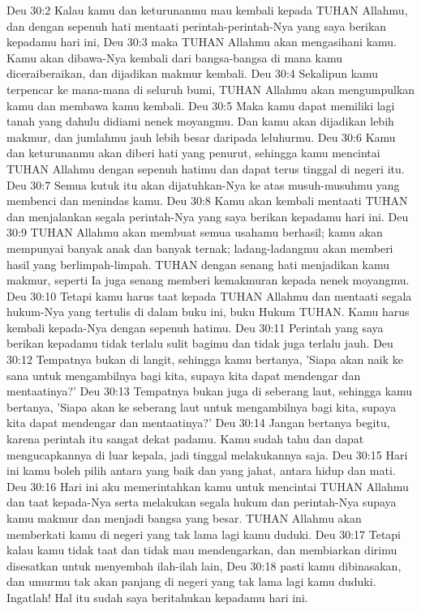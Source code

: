 Deu 30:2  Kalau kamu dan keturunanmu mau kembali kepada TUHAN Allahmu, dan dengan sepenuh hati mentaati perintah-perintah-Nya yang saya berikan kepadamu hari ini,
Deu 30:3  maka TUHAN Allahmu akan mengasihani kamu. Kamu akan dibawa-Nya kembali dari bangsa-bangsa di mana kamu diceraiberaikan, dan dijadikan makmur kembali.
Deu 30:4  Sekalipun kamu terpencar ke mana-mana di seluruh bumi, TUHAN Allahmu akan mengumpulkan kamu dan membawa kamu kembali.
Deu 30:5  Maka kamu dapat memiliki lagi tanah yang dahulu didiami nenek moyangmu. Dan kamu akan dijadikan lebih makmur, dan jumlahmu jauh lebih besar daripada leluhurmu.
Deu 30:6  Kamu dan keturunanmu akan diberi hati yang penurut, sehingga kamu mencintai TUHAN Allahmu dengan sepenuh hatimu dan dapat terus tinggal di negeri itu.
Deu 30:7  Semua kutuk itu akan dijatuhkan-Nya ke atas musuh-musuhmu yang membenci dan menindas kamu.
Deu 30:8  Kamu akan kembali mentaati TUHAN dan menjalankan segala perintah-Nya yang saya berikan kepadamu hari ini.
Deu 30:9  TUHAN Allahmu akan membuat semua usahamu berhasil; kamu akan mempunyai banyak anak dan banyak ternak; ladang-ladangmu akan memberi hasil yang berlimpah-limpah. TUHAN dengan senang hati menjadikan kamu makmur, seperti Ia juga senang memberi kemakmuran kepada nenek moyangmu.
Deu 30:10  Tetapi kamu harus taat kepada TUHAN Allahmu dan mentaati segala hukum-Nya yang tertulis di dalam buku ini, buku Hukum TUHAN. Kamu harus kembali kepada-Nya dengan sepenuh hatimu.
Deu 30:11  Perintah yang saya berikan kepadamu tidak terlalu sulit bagimu dan tidak juga terlalu jauh.
Deu 30:12  Tempatnya bukan di langit, sehingga kamu bertanya, 'Siapa akan naik ke sana untuk mengambilnya bagi kita, supaya kita dapat mendengar dan mentaatinya?'
Deu 30:13  Tempatnya bukan juga di seberang laut, sehingga kamu bertanya, 'Siapa akan ke seberang laut untuk mengambilnya bagi kita, supaya kita dapat mendengar dan mentaatinya?'
Deu 30:14  Jangan bertanya begitu, karena perintah itu sangat dekat padamu. Kamu sudah tahu dan dapat mengucapkannya di luar kepala, jadi tinggal melakukannya saja.
Deu 30:15  Hari ini kamu boleh pilih antara yang baik dan yang jahat, antara hidup dan mati.
Deu 30:16  Hari ini aku memerintahkan kamu untuk mencintai TUHAN Allahmu dan taat kepada-Nya serta melakukan segala hukum dan perintah-Nya supaya kamu makmur dan menjadi bangsa yang besar. TUHAN Allahmu akan memberkati kamu di negeri yang tak lama lagi kamu duduki.
Deu 30:17  Tetapi kalau kamu tidak taat dan tidak mau mendengarkan, dan membiarkan dirimu disesatkan untuk menyembah ilah-ilah lain,
Deu 30:18  pasti kamu dibinasakan, dan umurmu tak akan panjang di negeri yang tak lama lagi kamu duduki. Ingatlah! Hal itu sudah saya beritahukan kepadamu hari ini.
